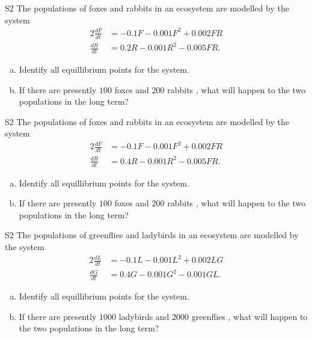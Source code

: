 \begin{problem}{S2}
The populations of foxes and rabbits in an ecosystem are modelled by the system
\begin{alignat*}{2}
\frac{dF}{dt} &= -0.1F - 0.001F^2 + 0.002FR \\
\frac{dR}{dt} & = 0.2R − 0.001R^2 - 0.005FR.
\end{alignat*}
\begin{enumerate}[(a)]
\item Identify all equillibrium points for the system.
\item If there are presently \(100\) foxes and \(200\) rabbits , what will happen to the two populations in the long term?
\end{enumerate}
\end{problem}

\begin{problem}{S2}
The populations of foxes and rabbits in an ecosystem are modelled by the system
\begin{alignat*}{2}
\frac{dF}{dt} &= -0.1F - 0.001F^2 + 0.002FR \\
\frac{dR}{dt} & = 0.4R − 0.001R^2 - 0.005FR.
\end{alignat*}
\begin{enumerate}[(a)]
\item Identify all equillibrium points for the system.
\item If there are presently \(100\) foxes and \(200\) rabbits , what will happen to the two populations in the long term?
\end{enumerate}
\end{problem}

\begin{problem}{S2}
The populations of greenflies and ladybirds in an ecosystem are modelled by the system
\begin{alignat*}{2}
\frac{dL}{dt} &= -0.1L - 0.001L^2 + 0.002LG \\
\frac{dG}{dt} & = 0.4G - 0.001G^2 - 0.001GL.
\end{alignat*}
\begin{enumerate}[(a)]
\item Identify all equillibrium points for the system.
\item If there are presently \(1000\) ladybirds and \(2000\) greenflies , what will happen to the two populations in the long term?
\end{enumerate}
\end{problem}

